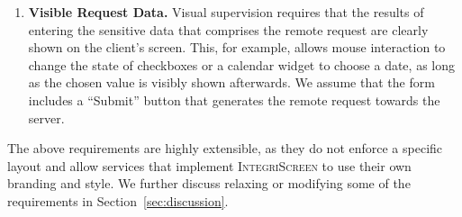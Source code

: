 \documentclass[sigconf, anonymous, balance=false]{acmart}
\let\oldding\ding%
\renewcommand{\ding}[2][1]{\scalebox{#1}{\oldding{#2}}}%
\newcommand{\five}{\ding[1.2]{176}\xspace}
\newcommand{\sysname}{\textsc{IntegriScreen}\xspace}
\newcommand{\name}{\sysname}
\begin{document}
\begin{enumerate}
	\item[\five] \textbf{Visible Request Data.}
	Visual supervision requires that the results of entering the sensitive data that comprises the remote request are clearly shown on the client's screen.
	This, for example, allows mouse interaction to change the state of checkboxes or a calendar widget to choose a date, as long as the chosen value is visibly shown afterwards.
	We assume that the form includes a ``Submit'' button that generates the remote request towards the server.

\end{enumerate}

The above requirements are highly extensible, as they do not enforce a specific layout and allow services that implement \name to use their own branding and style.
We further discuss relaxing or modifying some of the requirements in Section~\ref{sec:discussion}.
\end{document}
